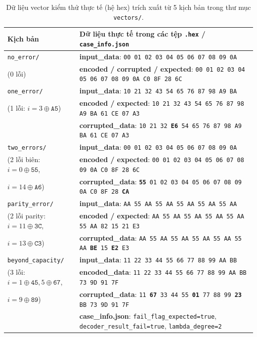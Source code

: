 \documentclass[11pt,a4paper]{report}
\begin{document}
\begin{table}[!htb]
\centering
\caption{Dữ liệu vector kiểm thử thực tế (hệ hex) trích xuất từ 5 kịch bản trong thư mục \texttt{vectors/}.}
\label{tab:vectors_hex_data}
\scriptsize
\renewcommand{\arraystretch}{1.04}
\begin{tabularx}{\textwidth}{@{} l X @{}}
\toprule
\textbf{Kịch bản} & \textbf{Dữ liệu thực tế trong các tệp \texttt{.hex} / \texttt{case\_info.json}} \\
\midrule
\texttt{no\_error/} &
\textbf{input\_data}: \texttt{00 01 02 03 04 05 06 07 08 09 0A} \\
(0 lỗi) & \textbf{encoded / corrupted / expected}: \texttt{00 01 02 03 04 05 06 07 08 09 0A C0 8F 28 6C} \\
\midrule
\texttt{one\_error/} &
\textbf{input\_data}: \texttt{10 21 32 43 54 65 76 87 98 A9 BA} \\
(1 lỗi: $i=3 \oplus \texttt{A5}$) & \textbf{encoded / expected}: \texttt{10 21 32 43 54 65 76 87 98 A9 BA 61 CE 07 A3} \\
& \textbf{corrupted\_data}: \texttt{10 21 32 \textbf{E6} 54 65 76 87 98 A9 BA 61 CE 07 A3} \\
\midrule
\texttt{two\_errors/} &
\textbf{input\_data}: \texttt{00 01 02 03 04 05 06 07 08 09 0A} \\
(2 lỗi biên: $i=0 \oplus \texttt{55}$, & \textbf{encoded / expected}: \texttt{00 01 02 03 04 05 06 07 08 09 0A C0 8F 28 6C} \\
$i=14 \oplus \texttt{A6}$) & \textbf{corrupted\_data}: \texttt{\textbf{55} 01 02 03 04 05 06 07 08 09 0A C0 8F 28 \textbf{CA}} \\
\midrule
\texttt{parity\_error/} &
\textbf{input\_data}: \texttt{AA 55 AA 55 AA 55 AA 55 AA 55 AA} \\
(2 lỗi parity: $i=11 \oplus \texttt{3C}$, & \textbf{encoded / expected}: \texttt{AA 55 AA 55 AA 55 AA 55 AA 55 AA 82 15 21 E3} \\
$i=13 \oplus \texttt{C3}$) & \textbf{corrupted\_data}: \texttt{AA 55 AA 55 AA 55 AA 55 AA 55 AA \textbf{BE} 15 \textbf{E2} E3} \\
\midrule
\texttt{beyond\_capacity/} &
\textbf{input\_data}: \texttt{11 22 33 44 55 66 77 88 99 AA BB} \\
(3 lỗi: $i=1\oplus\texttt{45}, 5\oplus\texttt{67}$, & \textbf{encoded\_data}: \texttt{11 22 33 44 55 66 77 88 99 AA BB 73 9D 91 7F} \\
$i=9\oplus\texttt{89}$) & \textbf{corrupted\_data}: \texttt{11 \textbf{67} 33 44 55 \textbf{01} 77 88 99 \textbf{23} BB 73 9D 91 7F} \\
& \textbf{case\_info.json}: \texttt{fail\_flag\_expected=true}, \texttt{decoder\_result\_fail=true}, \texttt{lambda\_degree=2} \\
\bottomrule
\end{tabularx}
\end{table}
\end{document}
